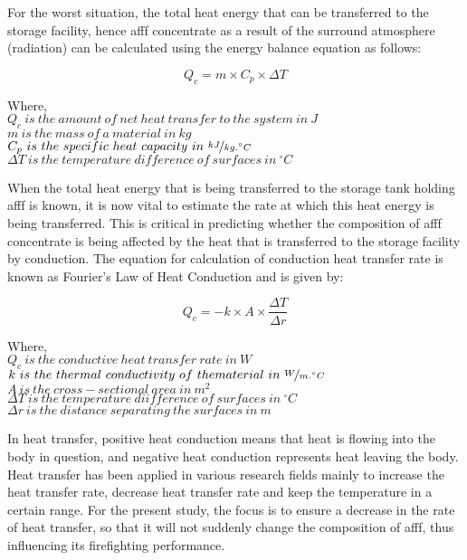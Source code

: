 For the worst situation, the total heat energy that can be transferred to the storage facility, hence \acrshort{afff} concentrate as a result of the surround atmosphere (radiation) can be calculated using the energy balance equation as follows:

\begin{equation}
    Q_c = m \times C_p \times \Delta T
\end{equation}

\begin{doublespace}
\noindent Where, \\
$Q_c\ is\ the\ amount\ of\ net\ heat\ transfer\ to\ the\ system\ in\ J$ \\
$m\ is\ the\ mass\ of\ a\ material\ in\ kg$ \\
$C_p\ is\ the\ specific\ heat\ capacity\ in\ \nicefrac{kJ}{kg.^\circ C}$ \\
$\Delta T\ is\ the\ temperature\ difference\ of\ surfaces\ in\ ^\circ C$ \\
\end{doublespace}

When the total heat energy that is being transferred to the storage tank holding \acrshort{afff} is known, it is now vital to estimate the rate at which this heat energy is being transferred. This is critical in predicting whether the composition of \acrshort{afff} concentrate is being affected by the heat that is transferred to the storage facility by conduction. The equation for calculation of conduction heat transfer rate is known as Fourier’s Law of Heat Conduction and is given by:

\begin{equation}
    Q_c = -k \times A \times \frac{\Delta T}{\Delta r}
\end{equation}


\begin{doublespace}
\noindent Where, \\
$Q_c\ is\ the\ conductive\ heat\ transfer\ rate\ in\ W$ \\
$k\ is\ the\ thermal\ conductivity\ of\ thematerial\ in\ \nicefrac{W}{m.^\circ C}$ \\
$A\ is\ the\ cross-sectional\ area\ in\ m^2$ \\
$\Delta T\ is\ the\ temperature\ diifference\ of\ surfaces\ in\ ^\circ C$ \\
$\Delta r\ is\ the\ distance\ separating\ the\ surfaces\ in\ m$ \\
\end{doublespace}
In heat transfer, positive heat conduction means that heat is flowing into the body in question, and negative heat conduction represents heat leaving the body. Heat transfer has been applied in various research fields mainly to increase the heat transfer rate, decrease heat transfer rate and keep the temperature in a certain range. For the present study, the focus is to ensure a decrease in the rate of heat transfer, so that it will not suddenly change the composition of \acrshort{afff}, thus influencing its firefighting performance.  

